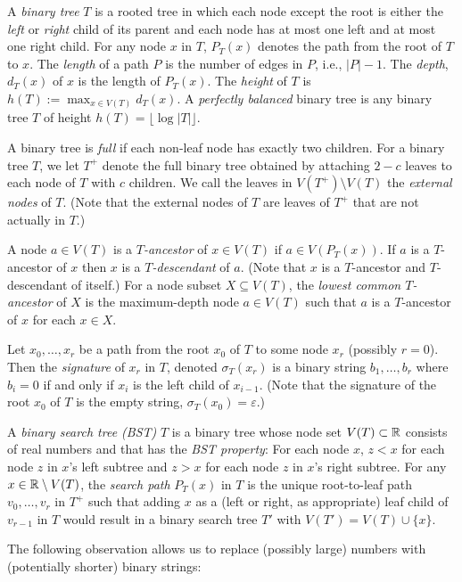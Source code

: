 \documentclass[kpfonts]{patmorin}
\begin{document}
A \emph{binary tree} $T$ is a rooted tree in which each node except the root is either the \emph{left} or \emph{right} child of its parent and each node has at most one left and at most one right child.  For any node $x$ in $T$, $P_T(x)$ denotes the path from the root of $T$ to $x$.  The \emph{length} of a path $P$ is the number of edges in $P$, i.e., $|P|-1$.  The \emph{depth}, $d_T(x)$ of $x$ is the length of $P_T(x)$.  The \emph{height} of $T$ is $h(T):=\max_{x\in V(T)} d_T(x)$.  A \emph{perfectly balanced} binary tree is any binary tree $T$ of height $h(T)=\lfloor\log|T|\rfloor$.

A binary tree is \emph{full} if each non-leaf node has exactly two children. For a binary tree $T$, we let $T^+$ denote the full binary tree obtained by attaching $2-c$ leaves to each node of $T$ with $c$ children.  We call the leaves in $V(T^+)\setminus V(T)$ the \emph{external nodes} of $T$.  (Note that the external nodes of $T$ are leaves of $T^+$ that are not actually in $T$.)

A node $a\in V(T)$ is a \emph{$T$-ancestor} of $x\in V(T)$ if $a\in V(P_T(x))$. If $a$ is a $T$-ancestor of $x$ then $x$ is a \emph{$T$-descendant} of $a$. (Note that $x$ is a $T$-ancestor and $T$-descendant of itself.)  For a node subset $X\subseteq V(T)$, the \emph{lowest common $T$-ancestor} of $X$ is the maximum-depth node $a\in V(T)$ such that $a$ is a $T$-ancestor of $x$ for each $x\in X$.  

Let $x_0,\ldots,x_{r}$ be a path from the root $x_0$ of $T$ to some node $x_r$ (possibly $r=0$).  Then the \emph{signature} of $x_r$ in $T$, denoted $\sigma_T(x_r)$ is a binary string $b_1,\ldots,b_r$ where $b_i=0$ if and only if $x_{i}$ is the left child of $x_{i-1}$.  (Note that the signature of the root $x_0$ of $T$ is the empty string,  $\sigma_T(x_0)=\varepsilon$.)

A \emph{binary search tree (BST)} $T$ is a binary tree  whose node set $V(T)\subset\mathbb{R}$ consists of real numbers and that has the \emph{BST property}:  For each node $x$, $z<x$ for each node $z$ in $x$'s left subtree and $z>x$ for each node $z$ in $x$'s right subtree. For any $x\in\mathbb{R}\setminus V(T)$, the \emph{search path} $P_T(x)$ in $T$ is the unique root-to-leaf path $v_0,\ldots,v_r$ in $T^+$ such that adding $x$ as a (left or right, as appropriate) leaf child of $v_{r-1}$ in $T$ would result in a binary search tree $T'$ with $V(T')=V(T)\cup\{x\}$.

The following observation allows us to replace (possibly large) numbers with (potentially shorter) binary strings:
\end{document}
